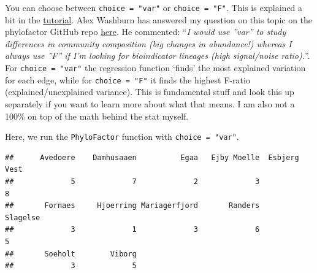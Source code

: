 \documentclass[
]{book}
\newenvironment{Shaded}{\begin{snugshade}}{\end{snugshade}}
\newcommand{\CommentTok}[1]{\textcolor[rgb]{0.56,0.35,0.01}{\textit{#1}}}
\newcommand{\FunctionTok}[1]{\textcolor[rgb]{0.00,0.00,0.00}{#1}}
\newcommand{\NormalTok}[1]{#1}
\newcommand{\OtherTok}[1]{\textcolor[rgb]{0.56,0.35,0.01}{#1}}
\newcommand{\SpecialCharTok}[1]{\textcolor[rgb]{0.00,0.00,0.00}{#1}}
\begin{document}
You can choose between \texttt{choice\ =\ "var"} or \texttt{choice\ =\ "F"}. This is explained a bit in the \href{https://docs.wixstatic.com/ugd/0119a1_099ae20df8424af9a38585dcebc0d45a.pdf}{tutorial}. Alex Washburn has answered my question on this topic on the phylofactor GitHub repo \href{https://github.com/reptalex/phylofactor/issues/39}{here}. He commented: ``\emph{I would use ''var'' to study differences in community composition (big changes in abundance!) whereas I always use ''F'' if I'm looking for bioindicator lineages (high signal/noise ratio).}''. For \texttt{choice\ =\ "var"} the regression function `finds' the most explained variation for each edge, while for \texttt{choice\ =\ "F"} it finds the highest F-ratio (explained/unexplained variance). This is fundamental stuff and look this up separately if you want to learn more about what that means. I am also not a 100\% on top of the math behind the stat myself.

Here, we run the \texttt{PhyloFactor} function with \texttt{choice\ =\ "var"}.

\begin{Shaded}
\end{Shaded}

\begin{verbatim}
##      Avedoere    Damhusaaen          Egaa   Ejby Moelle  Esbjerg Vest 
##             5             7             2             3             8 
##       Fornaes     Hjoerring Mariagerfjord       Randers      Slagelse 
##             3             1             3             6             5 
##       Soeholt        Viborg 
##             3             5
\end{verbatim}
\end{document}
